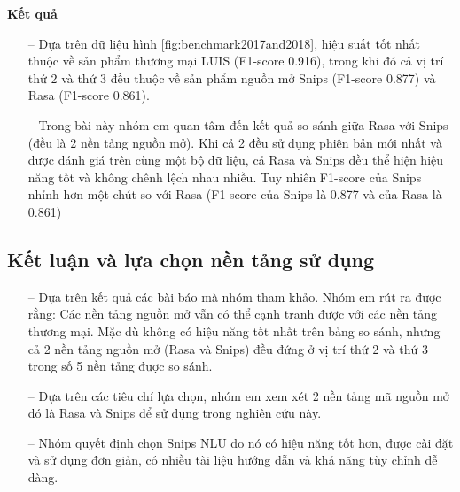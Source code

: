 \textbf{Kết quả}
\begin{itemize}
    \item[--] Dựa trên dữ liệu hình \ref{fig:benchmark2017and2018}, hiệu suất tốt nhất thuộc về sản phẩm thương mại LUIS (F1-score 0.916), trong khi đó cả vị trí thứ 2 và thứ 3 đều thuộc về sản phẩm nguồn mở Snips (F1-score 0.877) và Rasa  (F1-score 0.861).
    \item[--] Trong bài này nhóm em quan tâm đến kết quả so sánh giữa Rasa với Snips (đều là 2 nền tảng nguồn mở). Khi cả 2 đều sử dụng phiên bản mới nhất và được đánh giá trên cùng một bộ dữ liệu, cả Rasa và Snips đều thể hiện hiệu năng tốt và không chênh lệch nhau nhiều. Tuy nhiên F1-score của Snips nhỉnh hơn một chút so với Rasa (F1-score của Snips là 0.877 và của Rasa là 0.861)
\end{itemize}

\subsection{Kết luận và lựa chọn nền tảng sử dụng}

\begin{itemize}
    \item[--] Dựa trên kết quả các bài báo mà nhóm tham khảo. Nhóm em rút ra được rằng: Các nền tảng nguồn mở vẫn có thể cạnh tranh được với các nền tảng thương mại. Mặc dù không có hiệu năng tốt nhất trên bảng so sánh, nhưng cả 2 nền tảng nguồn mở (Rasa và Snips) đều đứng ở vị trí thứ 2 và thứ 3 trong số 5 nền tảng được so sánh.
    \item[--] Dựa trên các tiêu chí lựa chọn, nhóm em xem xét 2 nền tảng mã nguồn mở đó là Rasa và Snips để sử dụng trong nghiên cứu này. 
    \item[--] Nhóm quyết định chọn Snips NLU do nó có hiệu năng tốt hơn, được cài đặt và sử dụng đơn giản, có nhiều tài liệu hướng dẫn và khả năng tùy chỉnh dễ dàng.
\end{itemize}